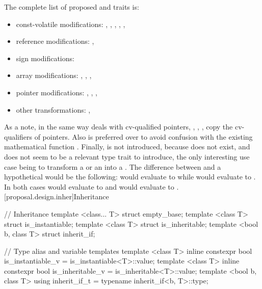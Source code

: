 \documentclass[ebook,10pt,oneside,openany,final]{memoir}
\begin{document}
The complete list of proposed  and  traits is:
\begin{itemize}
\item const-volatile modifications: , , , , , 
\item reference modifications: , 
\item sign modifications: 
\item array modifications: , , , 
\item pointer modifications: , , , 
\item other transformations: , 
\end{itemize}

As a note, in the same way  deals with cv-qualified pointers, , , ,  copy the cv-qualifiers of pointers. Also  is preferred over  to avoid confusion with the existing mathematical function . Finally,  is not introduced, because  does not exist, and does not seem to be a relevant type trait to introduce, the only interesting use case being to transform a  or an  into a . The difference between  and a hypothetical  would be the following:  would evaluate to  while  would evaluate to . In both cases  would evaluate to  and  would evaluate to .
[proposal.design.inher]{Inheritance}

\begin{codeblock}
// Inheritance
template <class... T> struct empty_base;
template <class T> struct is_instantiable;
template <class T> struct is_inheritable;
template <bool b, class T> struct inherit_if;

// Type alias and variable templates
template <class T> inline constexpr bool is_instantiable_v = is_instantiable<T>::value;
template <class T> inline constexpr bool is_inheritable_v = is_inheritable<T>::value;
template <bool b, class T> using inherit_if_t = typename inherit_if<b, T>::type;
\end{codeblock}
\end{document}

